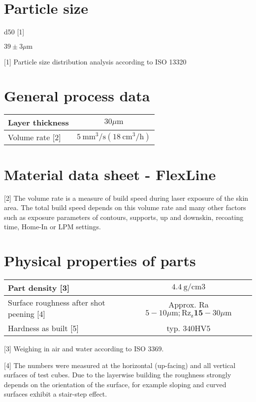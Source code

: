 \documentclass[10pt]{article}
\begin{document}
\section*{Particle size}
d50 [1]

$39 \pm 3 \mu \mathrm{m}$

[1] Particle size distribution analysis according to ISO 13320

\section*{General process data}
\begin{center}
\begin{tabular}{lc}
\hline
Layer thickness & $30 \mu \mathrm{m}$ \\
\hline
Volume rate [2] & $5 \mathrm{~mm}^{3} / \mathrm{s}\left(18 \mathrm{~cm}^{3} / \mathrm{h}\right)$ \\
\hline
\end{tabular}
\end{center}

\section*{Material data sheet - FlexLine}
[2] The volume rate is a measure of build speed during laser exposure of the skin area. The total build speed depends on this volume rate and many other factors such as exposure parameters of contours, supports, up and downskin, recoating time, Home-In or LPM settings.

\section*{Physical properties of parts}
\begin{center}
\begin{tabular}{lc}
\hline
Part density [3] & $4.4 \mathrm{~g} / \mathrm{cm} 3$ \\
\hline
Surface roughness after shot peening [4] & Approx. Ra $5-10 \mu \mathrm{m} ; \mathrm{Rz}_{\mathrm{z}} \mathbf{1 5}-30 \mu \mathrm{m}$ \\
\hline
Hardness as built [5] & typ. $340 \mathrm{HV} 5$ \\
\hline
\end{tabular}
\end{center}

[3] Weighing in air and water according to ISO 3369.

[4] The numbers were measured at the horizontal (up-facing) and all vertical surfaces of test cubes. Due to the layerwise building the roughness strongly depends on the orientation of the surface, for example sloping and curved surfaces exhibit a stair-step effect.
\end{document}
